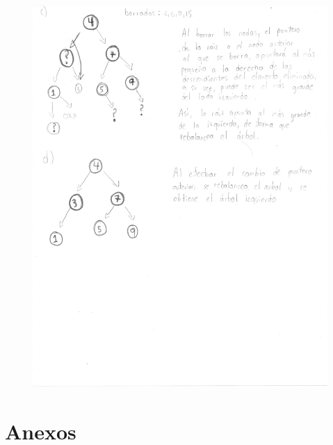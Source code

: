 \documentclass[11pt]{article}
\begin{document}
\newpage
\begin{figure}[H]
\includegraphics[width=18.5cm]{foto3.jpg}
\centering
\end{figure}
 
\section{Anexos}



\newpage



\newpage



\newpage


 
\end{document}
